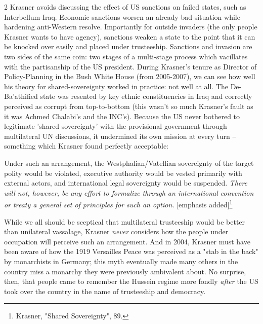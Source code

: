 \documentclass[letterpaper,12pt,twoside]{article}
\begin{document}
\begin {multicols}{2}
Krasner avoids discussing the effect of US sanctions on failed states, such as Interbellum Iraq. Economic sanctions worsen an already bad situation while hardening anti-Western resolve. Importantly for outside invaders (the only people Krasner wants to have agency), sanctions weaken a state to the point that it can be knocked over easily and placed under trusteeship. Sanctions and invasion are two sides of the same coin: two stages of a multi-stage process which vacillates with the partisanship of the US president. During Krasner's tenure as Director of Policy-Planning in the Bush White House (from 2005-2007), we can see how well his theory for shared-sovereignty worked in practice: not well at all. The De-Ba'athified state was resented by key ethnic constituencies in Iraq and correctly perceived as corrupt from top-to-bottom (this wasn't so much Krasner's fault as it was Achmed Chalabi's and the INC's). Because the US never bothered to legitimate 'shared sovereignty' with the provisional government through multilateral UN discussions, it undermined its own mission at every turn – something which Krasner found perfectly acceptable:
  \begin{displayquote}
    Under such an arrangement, the Westphalian/Vatellian sovereignty of the target polity would be violated, executive authority would be vested primarily with external actors, and international legal sovereignty would be suspended. \textit{There will not, however, be any effort to formalize through an international convention or treaty a general set of principles for such an option.} [emphasis added]\footnote{Krasner, "Shared Sovereignty", 89.}
  \end{displayquote}
While we all should be sceptical that multilateral trusteeship would be better than unilateral vassalage, Krasner \textit{never} considers how the people under occupation will perceive such an arrangement. And in 2004, Krasner must have been aware of how the 1919 Versailles Peace was perceived as a "stab in the back" by monarchists in Germany; this myth eventually made many others in the country miss a monarchy they were previously ambivalent about. No surprise, then, that people came to remember the Hussein regime more fondly \textit{after} the US took over the country in the name of trusteeship and democracy.


\end{multicols}
\end{document}

